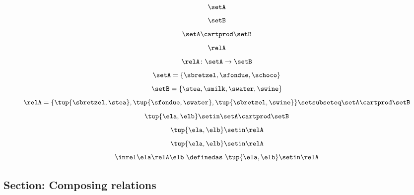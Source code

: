 \begin{forslides}

\begin{equation}\label{eq:slides_session2_rel_72}
\setA
\end{equation}
\begin{equation}\label{eq:slides_session2_rel_73}
\setB
\end{equation}
\begin{equation}\label{eq:slides_session2_rel_74}
\setA \cartprod \setB
\end{equation}
\begin{equation}\label{eq:slides_session2_rel_75}
\relA
\end{equation}
\begin{equation}\label{eq:slides_session2_rel_76}
\relA \colon \setA \to \setB
\end{equation}
 \begin{equation}\label{eq:slides_session2_rel_77}
\setA = \{ \sbretzel, \sfondue, \schoco \}
\end{equation}
\begin{equation}\label{eq:slides_session2_rel_78}
\setB = \{ \stea, \smilk, \swater, \swine \}
\end{equation}
 \begin{equation}\label{eq:slides_session2_rel_79}
\relA = \{ \tup{\sbretzel, \stea}, \tup{\sfondue, \swater}, \tup{\sbretzel, \swine} \} \setsubseteq \setA \cartprod \setB
\end{equation}
 \begin{equation}\label{eq:slides_session2_rel_80}
\tup{\ela,\elb} \setin \setA \cartprod \setB
\end{equation}
 \begin{equation}\label{eq:slides_session2_rel_81}
\tup{\ela,\elb} \setin \relA
\end{equation}
\begin{equation}\label{eq:slides_session2_rel_82}
\tup{\ela,\elb}\setin \relA
\end{equation}
 \begin{equation}\label{eq:slides_session2_rel_83}
\inrel \ela \relA \elb \ \definedas\  \tup{\ela,\elb}\setin \relA
\end{equation}

\subsection{Section: Composing relations}  


\end{forslides}

